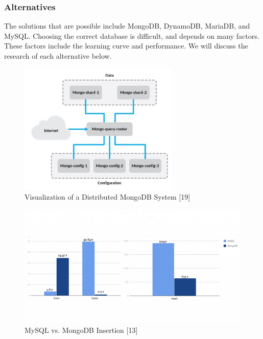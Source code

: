 \documentclass[12pt,journal,compsoc]{IEEEtran}
\newenvironment{subs}
  {\adjustwidth{1em}{0pt}}
  {\endadjustwidth}
\begin{document}
\begin{subs}
\begin{subs}
\subsubsection{Alternatives}
The solutions that are possible include MongoDB, DynamoDB, MariaDB, and MySQL. Choosing the correct database is difficult, and depends on many factors. These factors include the learning curve and performance. We will discuss the research of each alternative below.

\begin{figure}[H]
\centering
\includegraphics[width=3in]{images/mongo_mach.JPG}
\caption{Visualization of a Distributed MongoDB System [19]}
\label{fig:mongo_mach}
\end{figure}

\begin{figure}[H]
\centering
\includegraphics[width=7in]{images/data_insert.png}
\caption{MySQL vs. MongoDB Insertion [13]}
\label{fig:data_insert}
\end{figure}


\end{subs}
\end{subs}
\end{document}
